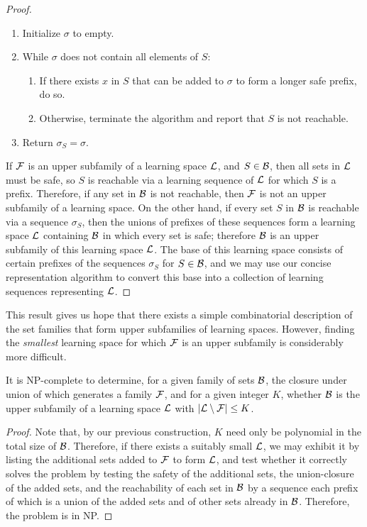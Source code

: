 \documentclass[11pt]{llncs}
\begin{document}
{\begin{proof}
\begin{enumerate}
\item Initialize $\sigma$ to empty.
\item While $\sigma$ does not contain all elements of $S$:
\begin{enumerate}
\item If there exists $x$ in $S$ that can be added to $\sigma$ to form a longer safe prefix, do so.
\item Otherwise, terminate the algorithm and report that $S$ is not reachable.
\end{enumerate}
\item Return $\sigma_S=\sigma$.
\end{enumerate}

If $\cal F$ is an upper subfamily of a learning space $\cal L$, and $S\in\cal B$, then all sets in $\cal L$ must be safe, so $S$ is reachable via a learning sequence of $\cal L$ for which $S$ is a prefix. Therefore, if any set in $\cal B$ is not reachable, then $\cal F$ is not an upper subfamily of a learning space. On the other hand, if every set $S$ in $\cal B$ is reachable via a sequence $\sigma_S$,
then the unions of prefixes of these sequences form a learning space $\cal L$ containing $\cal B$ in which every set is safe; therefore $\cal B$ is an upper subfamily of this learning space $\cal L$.
The base of this learning space consists of certain prefixes of the sequences $\sigma_S$ for $S\in\cal B$, and we may use our concise representation algorithm to convert this base into a collection of learning sequences representing $\cal L$.
\end{proof}

This result gives us hope that there exists a simple combinatorial description of the set families that form upper subfamilies of learning spaces.
However, finding the \emph{smallest} learning space for which $\cal F$ is an upper subfamily is considerably more difficult.

\begin{theorem}
It is NP-complete to determine, for a given family of sets $\cal B$,  the closure under union of which generates a family $\cal F$, and for a given integer $K$, whether $\cal B$ is the upper subfamily of a learning space $\cal L$ with $|{\cal L}\setminus{\cal F}|\le K$.
\end{theorem}

\begin{proof}
Note that, by our previous construction, $K$ need only be polynomial in the total size of $\cal B$.
Therefore, if there exists a suitably small $\cal L$, we may exhibit it by listing the additional sets
added to $\cal F$ to form $\cal L$, and test whether it correctly solves the problem by testing the safety of the additional sets, the union-closure of the added sets, and the reachability of each set in $\cal B$ by a sequence each prefix of which is a union of the added sets and of other sets already in $\cal B$.
Therefore, the problem is in NP.


\end{proof}}
\end{document}
